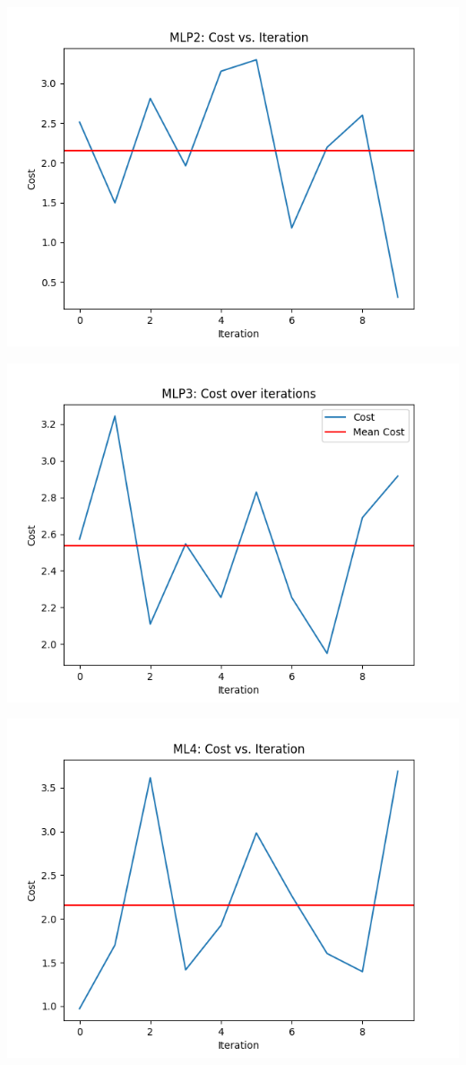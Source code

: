 \documentclass{article}
\begin{document}
\begin{center}
    \includegraphics[scale=0.5]{RI/MLP2.png}
\end{center}
\begin{center}
    \includegraphics[scale=0.5]{RI/MLP3.png}
\end{center}
\begin{center}
    \includegraphics[scale=0.5]{RI/MLP4.png}
\end{center}
\end{document}
